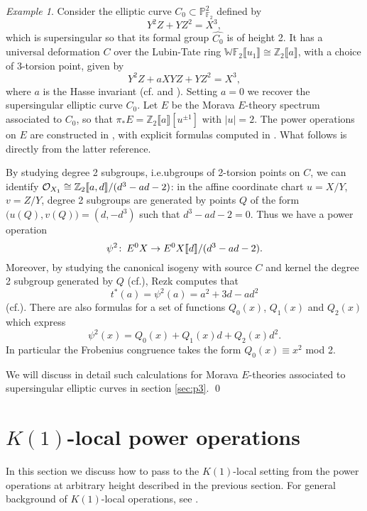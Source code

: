 \documentclass{gtpart}
\theoremstyle{definition}
\theoremstyle{remark}
\newtheorem{exam}[thm]{Example}
\def\co{\colon\thinspace}
\newcommand{\mb}[1]{\mathbb{#1}}
\newcommand{\CO}{{\cal O}}
\newcommand{\cff}[2]{cf.\thinspace{\cite[#1]{#2}}}
\begin{document}
\begin{exam}
\label{ex:h2p2}
 Consider the elliptic curve $C_0 \subset {\mb P}_{{\mb F}_2}^2$ defined by 
 \[
  Y^2 Z + Y Z^2 = X^3, 
 \]
 which is supersingular so that its formal group $\widehat{C_0}$ is of height 
 2.  It has a universal deformation $C$ over  the Lubin-Tate ring 
 ${\mb W}{\mb F}_2 \llbracket u_1 \rrbracket \cong 
 {\mb Z}_2 \llbracket a \rrbracket$, with a choice of 3-torsion point, given 
 by 
 \[
  Y^2 Z + a X Y Z + Y Z^2 = X^3, 
 \]
 where $a$ is the Hasse invariant (\cff{2.2.10}{katzmazur} and 
 \cite[proposition 3.2]{tmf3}).  Setting $a=0$ we recover the supersingular 
 elliptic curve $C_0$.  Let $E$ be the Morava $E$-theory spectrum 
 associated to $C_0$, so that $\pi_* E = {\mb Z}_2 \llbracket a \rrbracket 
 [u^{\pm 1}]$ with $|u| = 2$.  The power operations on $E$ are constructed in 
 \cite[section 3]{Andu}, with explicit formulas computed in 
 \cite[sections 3 and 4]{h2p2}.  What follows is directly from the latter 
 reference.  

 By studying degree 2 subgroups, i.e.ubgroups of 2-torsion points 
 on $C$, we can identify $\CO_{X_1} \cong 
 {\mb Z}_2 \llbracket a,d \rrbracket / (d^3 - a d - 2)$: in the affine 
 coordinate chart $u = X/Y$, $v = Z/Y$, degree 2 subgroups are generated by 
 points $Q$ of the form $\big(u(Q), v(Q)\big) = (d, -d^3)$ such that 
 $d^3 - a d - 2 = 0$.  Thus we have a power operation 
 \[
  \psi^2\co E^0 X \to E^0 X \llbracket d \rrbracket / (d^3 - a d - 2).  
 \]
 Moreover, by studying the canonical isogeny with source $C$ and kernel the 
 degree 2 subgroup generated by $Q$ (\cff{theorem 1.4}{lubin}), Rezk computes 
 that 
 \[
  t^* (a) = \psi^2 (a) = a^2 + 3 d - a d^2
 \]
 (\cff{p.\thinspace{6}}{h2p2}).  There are also formulas for a set of 
 functions $Q_0(x)$, $Q_1(x)$ and $Q_2(x)$ which express 
 \[
  \psi^2 (x) = Q_0(x) + Q_1(x) d + Q_2(x) d^2.  
 \]
 In particular the Frobenius congruence takes the form $Q_0(x) \equiv x^2$ mod 
 2.  

 We will discuss in detail such calculations for Morava $E$-theories 
 associated to supersingular elliptic curves in section \ref{sec:p3}.  \qed
\end{exam}


\section{$K(1)$-local power operations}
\label{sec:K(1)}

In this section we discuss how to pass to the $K(1)$-local setting from the 
power operations at arbitrary height described in the previous section.  For 
general background of $K(1)$-local operations, see \cite{k1}.  
\end{document}
